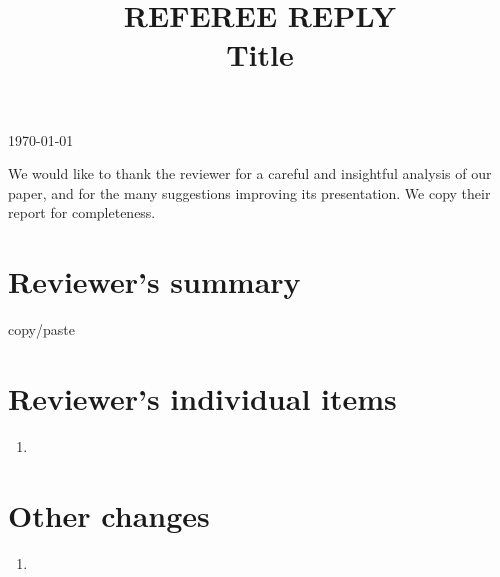 \documentclass{amsart}
\title[Referee reply]{REFEREE REPLY \\ Title}
\begin{document}
	\noindent\today
	\maketitle

	We would like to thank the reviewer for a careful and insightful analysis of our paper, and for the many suggestions improving its presentation.
	We copy their report for completeness.

	\section{Reviewer's summary}

	\noindent copy/paste

	\section{Reviewer's individual items}

	\begin{enumerate}
		\item
	\end{enumerate}

	\section{Other changes}

	\begin{enumerate}
		\item
	\end{enumerate}
\end{document}
